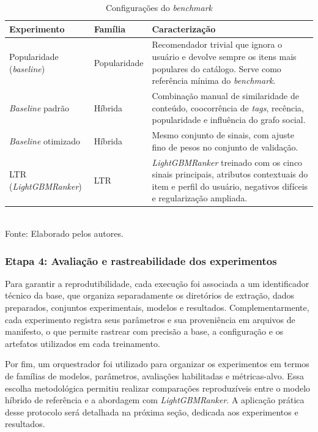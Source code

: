\documentclass[a4paper,12pt]{article}
\begin{document}
{\begin{table}[H]
\centering
\caption{Configurações do \textit{benchmark}}
\label{tab:configuracoes_benchmark_tcc}
\small
\begin{tabular}{|p{3.2cm}|p{2.2cm}|p{9.0cm}|}
\hline
\textbf{Experimento} & \textbf{Família} & \textbf{Caracterização} \\
\hline
Popularidade (\textit{baseline}) & Popularidade & Recomendador trivial que ignora o usuário e devolve sempre os itens mais populares do catálogo. Serve como referência mínima do \textit{benchmark}. \\
\hline
\textit{Baseline} padrão & Híbrida & Combinação manual de similaridade de conteúdo, coocorrência de \textit{tags}, recência, popularidade e influência do grafo social. \\
\hline
\textit{Baseline} otimizado & Híbrida & Mesmo conjunto de sinais, com ajuste fino de pesos no conjunto de validação. \\
\hline
LTR (\textit{LightGBMRanker}) & LTR & \textit{LightGBMRanker} treinado com os cinco sinais principais, atributos contextuais do item e perfil do usuário, negativos difíceis e regularização ampliada. \\
\hline
\end{tabular}
\small \\ Fonte: Elaborado pelos autores.
\end{table}

\subsubsection{Etapa 4: Avaliação e rastreabilidade dos experimentos}

Para garantir a reprodutibilidade, cada execução foi associada a um identificador técnico da base, que organiza separadamente os diretórios de extração, dados preparados, conjuntos experimentais, modelos e resultados. Complementarmente, cada experimento registra seus parâmetros e sua proveniência em arquivos de manifesto, o que permite rastrear com precisão a base, a configuração e os artefatos utilizados em cada treinamento.

Por fim, um orquestrador foi utilizado para organizar os experimentos em termos de famílias de modelos, parâmetros, avaliações habilitadas e métricas-alvo. Essa escolha metodológica permitiu realizar comparações reproduzíveis entre o modelo híbrido de referência e a abordagem com \textit{LightGBMRanker}. A aplicação prática desse protocolo será detalhada na próxima seção, dedicada aos experimentos e resultados.

}
\end{document}

